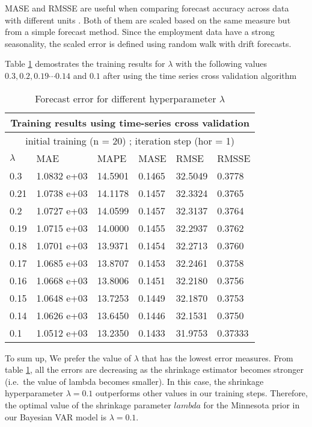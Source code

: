 \documentclass{monashthesis}
\begin{document}
MASE and RMSSE are useful when comparing forecast accuracy across data with different units \autocite{hyndman2006}. Both of them are scaled based on the same measure but from a simple forecast method. Since the employment data have a strong seasonality, the scaled error is defined using random walk with drift forecasts.

\vspace{24pt}

Table \ref{testres} demostrates the training results for \(\lambda\) with the following values \(0.3,0.2,0.19 \cdots 0.14\) and \(0.1\) after using the time series cross validation algorithm

\begin{table}[h]
\begin{center}
\begin{tabular}{|p{2cm}|p{2cm}|p{2cm}|p{2cm}|p{2cm}|p{2cm}|}
\hline\hline
\multicolumn{6}{|c|}{Training results using time-series cross validation}\\
\hline
\multicolumn{6}{|c|}{initial training (n = 20) ; iteration step (hor = 1)}\\
\hline\hline
 $\lambda$    & MAE         & MAPE    & MASE   & RMSE    & RMSSE  \\
\hline\hline
0.3  & 1.0832 e+03 & 14.5901 & 0.1465 & 32.5049 & 0.3778 \\
0.21 & 1.0738 e+03 & 14.1178 & 0.1457 & 32.3324 & 0.3765 \\
0.2  & 1.0727 e+03 & 14.0599 & 0.1457 & 32.3137 & 0.3764 \\
0.19 & 1.0715 e+03 & 14.0000 & 0.1455 & 32.2937 & 0.3762 \\
0.18 & 1.0701 e+03 & 13.9371 & 0.1454 & 32.2713 & 0.3760 \\
0.17 & 1.0685 e+03 & 13.8707 & 0.1453 & 32.2461 & 0.3758 \\
0.16 & 1.0668 e+03 & 13.8006 & 0.1451 & 32.2180 & 0.3756 \\
0.15 & 1.0648 e+03 & 13.7253 & 0.1449 & 32.1870 & 0.3753 \\
0.14 & 1.0626 e+03 & 13.6450 & 0.1446 & 32.1531 & 0.3750 \\
0.1  & 1.0512 e+03 & 13.2350 & 0.1433 & 31.9753 & 0.37333\\
\hline\hline
\end{tabular}
\end{center}
\caption{Forecast error for different hyperparameter $\lambda$}
\label{testres}
\end{table}

To sum up, We prefer the value of \(\lambda\) that has the lowest error measures. From table \ref{testres}, all the errors are decreasing as the shrinkage estimator becomes stronger (i.e.~the value of lambda becomes smaller). In this case, the shrinkage hyperparameter \(\lambda=0.1\) outperforms other values in our training steps. Therefore, the optimal value of the shrinkage parameter \(lambda\) for the Minnesota prior in our Bayesian VAR model is \(\lambda=0.1\).
\end{document}
